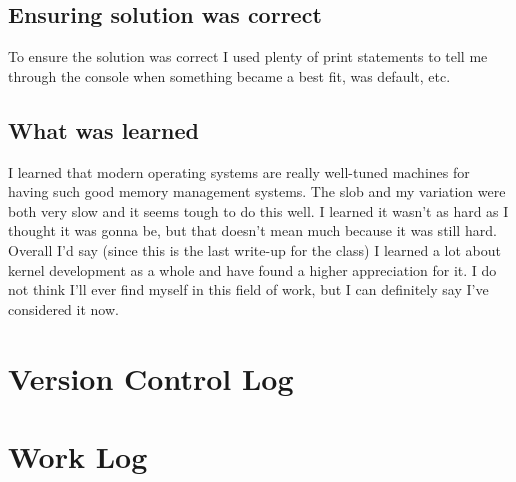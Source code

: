 \documentclass[10pt,draftclsnofoot,onecolumn]{IEEEtran}
\begin{document}
\subsection{Ensuring solution was correct}
To ensure the solution was correct I used plenty of print statements to tell me through the console when something became a best fit, was default, etc.

\subsection{What was learned}
I learned that modern operating systems are really well-tuned machines for having such good memory management systems.
The slob and my variation were both very slow and it seems tough to do this well.
I learned it wasn't as hard as I thought it was gonna be, but that doesn't mean much because it was still hard.
Overall I'd say (since this is the last write-up for the class) I learned a lot about kernel development as a whole and have found a higher appreciation for it.
I do not think I'll ever find myself in this field of work, but I can definitely say I've considered it now.

\section{Version Control Log}


\section{Work Log}

\end{document}

